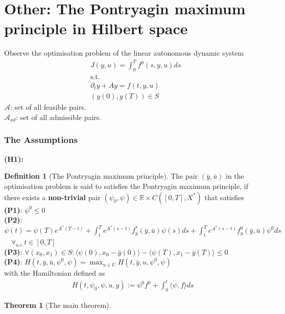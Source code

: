 \documentclass[a4paper,11pt,fleqn]{book}
\newtheorem{theorem}{Theorem}[section]
\theoremstyle{definition}
\newtheorem{definition}{Definition}[section]
\theoremstyle{remark}
\begin{document}
\section{Other: The Pontryagin maximum principle in Hilbert space}
Observe the optimisation problem of the linear autonomous dynamic system
\begin{align*}
	& J(y, u) = \int_0^T f^0(s, y, u) ds \\
	& \text{s.t.}\\
	& \partial_t y + A y = f(t, y, u)\\
	& (y(0), y(T)) \in S
\end{align*}
$\mathcal{A}$: set of all feasible pairs. \\
$\mathcal{A}_{ad}$: set of all admissible pairs.

\subsubsection*{The Assumptions}
\textbf{(H1):}


\begin{definition}[The Pontryagin maximum principle]
	The pair $(\bar{y}, \bar{u})$ in the optimisation problem is said to satisfies the Pontryagin maximum principle, if there exists a \textbf{non-trivial} pair $(\psi_0, \psi) \in \mathbb{R} \times C([0, T], X^*)$ that satisfies\\
	\textbf{(P1)}: $\psi^0 \le 0$\\
	\textbf{(P2)}: $\psi(t) = \psi(T) e^{A^*(T - t)} + \int_t^T e^{A^*(s - t)} f_y^*(\bar{y}, \bar{u}) \psi(s) ds + \int_t^T e^{A^*(s - t)} f^0_y(\bar{y}, \bar{u}) \psi^0 ds  $ $\quad\forall_{a.e.} t \in [0, T]$\\
	\textbf{(P3)}: $\forall (x_0, x_1) \in S: \langle \psi(0), x_0 - \bar{y}(0) \rangle - \langle \psi(T), x_1 - \bar{y}(T) \rangle \le 0$\\
	\textbf{(P4)}: $H(t, \bar{y}, \bar{u}, \psi^0, \psi) = \max_{u \in U} H(t, \bar{y}, u, \psi^0, \psi)$
	\\
	with the Hamiltonian defined as
	\begin{align*}
		H(t, \psi_0, \psi, u, y):= \psi^0 f^0 + \int_0^t \langle \psi, f \rangle ds
	\end{align*}
\end{definition}

\begin{theorem}[The main theorem]
	
\end{theorem}
\end{document}
